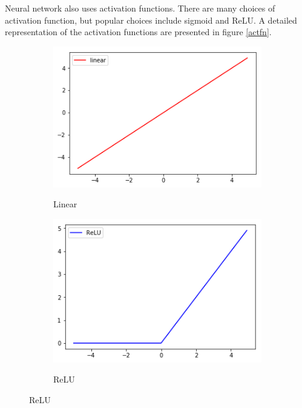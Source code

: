 Neural network also uses activation functions. There are many choices of activation function, but popular choices include sigmoid and ReLU. A detailed representation of the activation functions are presented in figure \ref{actfn}.
\begin{figure}
\centering
\begin{subfigure}{0.4\linewidth}
\includegraphics[width=\linewidth]{Figures/linear_act.png}
\label{linear} 
\caption{Linear}
\end{subfigure}
\begin{subfigure}{0.4\linewidth}
\includegraphics[width=\linewidth]{Figures/relu_act.png}
	\label{relu}
          \caption{ReLU}
\end{subfigure}

\end{figure}
